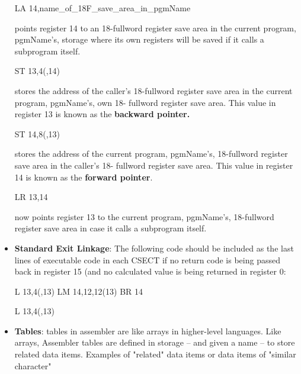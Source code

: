 \documentclass{report}
\begin{document}
\begin{itemize}
            \begin{cppcode}
            LA    14,name_of_18F_save_area_in_pgmName
            \end{cppcode}
            points register 14 to an 18-fullword register save area in the current program, pgmName's, storage where its own registers will be saved if it calls a subprogram itself.
            \bigbreak \noindent 
            \begin{cppcode}
            ST    13,4(,14)
            \end{cppcode}
            \bigbreak \noindent 
            stores the address of the caller's 18-fullword register save area in the current program, pgmName's, own 18- fullword register save area. This value in register 13 is known as the \textbf{backward pointer.}
            \bigbreak \noindent 
            \begin{cppcode}
            ST    14,8(,13)
            \end{cppcode}
            stores the address of the current program, pgmName's, 18-fullword register save area in the caller's 18- fullword register save area. This value in register 14 is known as the \textbf{forward pointer}.
            \bigbreak \noindent 
            \begin{cppcode}
            LR    13,14
            \end{cppcode}
            \bigbreak \noindent 
            now points register 13 to the current program, pgmName's, 18-fullword register save area in case it calls a subprogram itself.
        \item \textbf{Standard Exit Linkage}: The following code should be included as the last lines of executable code in each CSECT if no return code is being passed back in register 15 (and no calculated value is being returned in register 0:
            \bigbreak \noindent 
            \begin{cppcode}
            L    13,4(,13)     
            LM   14,12,12(13)
            BR   14
            \end{cppcode}
            \bigbreak \noindent 
            \begin{cppcode}
            L    13,4(,13)
            \end{cppcode}
        \item \textbf{Tables}: tables in assembler are like arrays in higher-level languages. Like arrays, Assembler tables are defined in storage – and given a name – to store related data items.
            \bigbreak \noindent 
            Examples of "related" data items or data items of "similar character"

\end{itemize}
\end{document}
